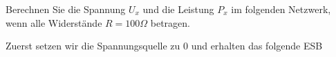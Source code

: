 \beginbsp
Berechnen Sie die Spannung $U_x$ und die Leistung $P_x$ im folgenden Netzwerk, wenn alle Widerstände $ R = 100 \Omega$ betragen. \\
\begin{center}
	\fix
\end{center}
\iend
\newpage
{}
\beginbsp
Zuerst setzen wir die Spannungsquelle zu 0 und erhalten das folgende ESB \\
\begin{center}
	\fix
\end{center}

